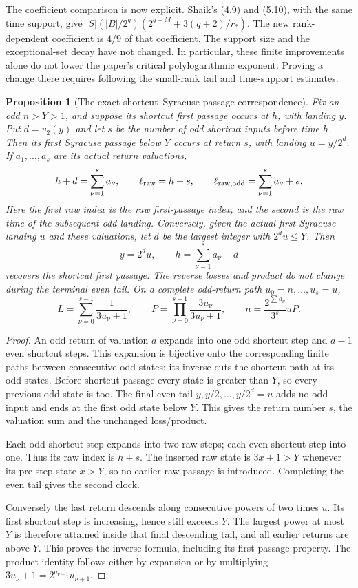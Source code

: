 \documentclass[11pt]{article}
\newtheorem{proposition}{Proposition}
\theoremstyle{remark}\newtheorem{remark}[proposition]{Remark}
\begin{document}
The coefficient comparison is now explicit. Shaik's (4.9) and (5.10),
with the same time support, give
\(|S|(|B|/2^q)(2^{q-M}+3(q+2)/r_*)\).
The new rank-dependent coefficient is \(4/9\) of that coefficient.
The support size and the exceptional-set decay have not changed.
In particular, these finite improvements alone do not lower the
paper's critical polylogarithmic exponent. Proving a change there
requires following the small-rank tail and time-support estimates.

\begin{proposition}[The exact shortcut--Syracuse passage correspondence]
\label{prop:shaik-clock-map}
Fix an odd \(n>Y>1\), and suppose its shortcut first passage occurs at
\(h\), with landing \(y\). Put \(d=v_2(y)\) and let \(s\) be the
number of odd shortcut inputs before time \(h\). Then its first
Syracuse passage below \(Y\) occurs at return \(s\), with landing
\(u=y/2^d\). If \(a_1,\ldots,a_s\) are its actual return valuations,
\begin{equation}\label{eq:shaik-clock-map}
 h+d=\sum_{\nu=1}^s a_\nu,\qquad
 \ell_{\rm raw}=h+s,\qquad
 \ell_{\rm raw,odd}=\sum_{\nu=1}^s a_\nu+s.
\end{equation}
Here the first raw index is the raw first-passage index, and the
second is the raw time of the subsequent odd landing.
Conversely, given the actual first Syracuse landing \(u\) and
these valuations, let \(d\) be the largest integer with \(2^du\le Y\).
Then
\[
 y=2^du,\qquad h=\sum_{\nu=1}^s a_\nu-d
\]
recovers the shortcut first passage.
The reverse losses and product do not change during the terminal
even tail. On a complete odd-return path \(u_0=n,\ldots,u_s=u\),
\[
 L=\sum_{\nu=0}^{s-1}\frac1{3u_\nu+1},\qquad
 P=\prod_{\nu=0}^{s-1}\frac{3u_\nu}{3u_\nu+1},\qquad
 n=\frac{2^{\sum a_\nu}}{3^s}uP.
\]
\end{proposition}
\begin{proof}
An odd return of valuation \(a\) expands into one odd shortcut step
and \(a-1\) even shortcut steps. This expansion is bijective onto the
corresponding finite paths between consecutive odd states; its inverse
cuts the shortcut path at its odd states. Before shortcut passage
every state is greater than \(Y\), so every previous odd state is too.
The final even tail \(y,y/2,\ldots,y/2^d=u\) adds no odd input and
ends at the first odd state below \(Y\). This gives the return number
\(s\), the valuation sum and the unchanged loss/product.

Each odd shortcut step expands into two raw steps; each even shortcut
step into one. Thus its raw index is \(h+s\). The inserted raw state
is \(3x+1>Y\) whenever its pre-step state \(x>Y\), so no earlier raw
passage is introduced. Completing the even tail gives the second clock.

Conversely the last return descends along consecutive powers of two
times \(u\). Its first shortcut step is increasing, hence still exceeds
\(Y\). The largest power at most \(Y\) is therefore attained inside
that final descending tail, and all earlier returns are above \(Y\).
This proves the inverse formula, including its first-passage property.
The product identity follows either by expansion or by multiplying
\(3u_\nu+1=2^{a_{\nu+1}}u_{\nu+1}\).
\end{proof}
\end{document}
